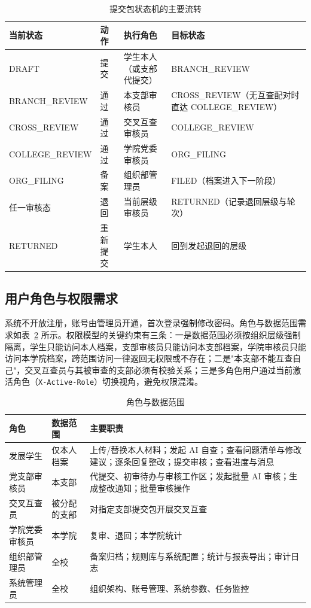 \documentclass[12pt,a4paper]{ctexart}
\begin{document}
\begin{table}[H]
  \centering
  \caption{提交包状态机的主要流转}
  \label{tab:state}
  \footnotesize
  \setlength{\tabcolsep}{4pt}
  \begin{tabular}{p{3.5cm}p{1.7cm}p{2.7cm}p{5.4cm}}
    \toprule
    \textbf{当前状态} & \textbf{动作} & \textbf{执行角色} & \textbf{目标状态} \\
    \midrule
    DRAFT & 提交 & 学生本人（或支部代提交） & BRANCH\_REVIEW \\
    BRANCH\_REVIEW & 通过 & 本支部审核员 & CROSS\_REVIEW（无互查配对时直达 COLLEGE\_REVIEW） \\
    CROSS\_REVIEW & 通过 & 交叉互查审核员 & COLLEGE\_REVIEW \\
    COLLEGE\_REVIEW & 通过 & 学院党委审核员 & ORG\_FILING \\
    ORG\_FILING & 备案 & 组织部管理员 & FILED（档案进入下一阶段） \\
    任一审核态 & 退回 & 当前层级审核员 & RETURNED（记录退回层级与轮次） \\
    RETURNED & 重新提交 & 学生本人 & 回到发起退回的层级 \\
    \bottomrule
  \end{tabular}
\end{table}

\subsection{用户角色与权限需求}

系统不开放注册，账号由管理员开通，首次登录强制修改密码。角色与数据范围需求如表~\ref{tab:role} 所示。权限模型的关键约束有三条：一是数据范围必须按组织层级强制隔离，学生只能访问本人档案，支部审核员只能访问本支部档案，学院审核员只能访问本学院档案，跨范围访问一律返回无权限或不存在；二是"本支部不能互查自己"，交叉互查员与其被审查的支部必须有校验关系；三是多角色用户通过当前激活角色（\texttt{X-Active-Role}）切换视角，避免权限混淆。

\begin{table}[H]
  \centering
  \caption{角色与数据范围}
  \label{tab:role}
  \small
  \begin{tabular}{p{2.6cm}p{4.2cm}p{7.0cm}}
    \toprule
    \textbf{角色} & \textbf{数据范围} & \textbf{主要职责} \\
    \midrule
    发展学生 & 仅本人档案 & 上传/替换本人材料；发起 AI 自查；查看问题清单与修改建议；逐条回复整改；提交审核；查看进度与消息 \\
    党支部审核员 & 本支部 & 代提交、初审待办与审核工作区；发起批量 AI 审核；生成整改通知；批量审核操作 \\
    交叉互查员 & 被分配的支部 & 对指定支部提交包开展交叉互查 \\
    学院党委审核员 & 本学院 & 复审、退回；\allowbreak 本学院统计 \\
    组织部管理员 & 全校 & 备案归档；规则库与系统配置；统计与报表导出；审计日志 \\
    系统管理员 & 全校 & 组织架构、账号管理、系统参数、任务监控 \\
    \bottomrule
  \end{tabular}
\end{table}
\end{document}
